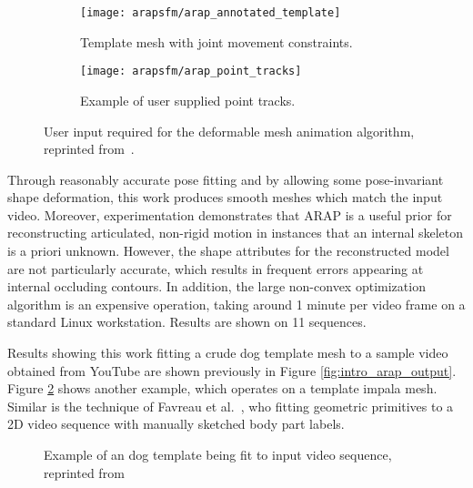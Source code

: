     \begin{figure}[t]
        \centering
        \begin{subfigure}{0.5\textwidth}
        \centering
            \texttt{[image: arapsfm/arap\_annotated\_template]}
            \caption{Template mesh with joint movement constraints.}
        \end{subfigure}%
        \begin{subfigure}{0.5\textwidth}
        \centering
            \texttt{[image: arapsfm/arap\_point\_tracks]}
            \caption{Example of user supplied point tracks.}
        \end{subfigure}%
        \caption{User input required for the deformable mesh animation algorithm, reprinted from~\cite{arap_stebbing}.}
        \label{fig:arap_user}
    \end{figure} 

    Through reasonably accurate pose fitting and by allowing some pose-invariant shape deformation, this work produces smooth meshes which match the input video. Moreover, experimentation demonstrates that ARAP is a useful prior for reconstructing articulated, non-rigid motion in instances that an internal skeleton is a priori unknown. However, the shape attributes for the reconstructed model are not particularly accurate, which results in frequent errors appearing at internal occluding contours. In addition, the large non-convex optimization algorithm is an expensive operation, taking around 1 minute per video frame on a standard Linux workstation. Results are shown on 11 sequences.

    Results showing this work fitting a crude dog template mesh to a sample video obtained from YouTube are shown previously in Figure \ref{fig:intro_arap_output}. Figure \ref{fig:arap_output} shows another example, which operates on a template impala mesh. Similar is the technique of Favreau et al.~, who fitting geometric primitives to a 2D video sequence with manually sketched body part labels. %

    \begin{figure}[t]
        \caption{Example of an dog template being fit to input video sequence, reprinted from~\cite{arap_stebbing}}
        \label{fig:arap_output}
    \end{figure}

